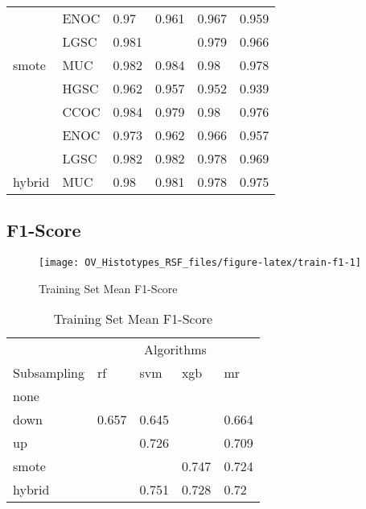 \documentclass[
]{report}
\begin{document}
\begin{table}
\begin{tabular}[t]{l|l|l|l|l|l}
\cline{2-6}
 & ENOC & 0.97 & 0.961 & 0.967 & 0.959\\
\cline{2-6}
 & LGSC & 0.981 & \cellcolor[HTML]{90ee90}{0.985} & 0.979 & 0.966\\
\cline{2-6}
\multirow{-5}{*}{\raggedright\arraybackslash smote} & MUC & 0.982 & 0.984 & 0.98 & 0.978\\
\cline{1-6}
 & HGSC & 0.962 & 0.957 & 0.952 & 0.939\\
\cline{2-6}
 & CCOC & 0.984 & 0.979 & 0.98 & 0.976\\
\cline{2-6}
 & ENOC & 0.973 & 0.962 & 0.966 & 0.957\\
\cline{2-6}
 & LGSC & 0.982 & 0.982 & 0.978 & 0.969\\
\cline{2-6}
\multirow{-5}{*}{\raggedright\arraybackslash hybrid} & MUC & 0.98 & 0.981 & 0.978 & 0.975\\
\hline
\end{tabular}
\end{table}

\hypertarget{f1-score-1}{%
\subsection{F1-Score}\label{f1-score-1}}

\begin{figure}[H]

{\centering \texttt{[image: OV\_Histotypes\_RSF\_files/figure-latex/train-f1-1]} 

}

\caption{Training Set Mean F1-Score}\label{fig:train-f1}
\end{figure}

\begin{table}

\caption{\label{tab:train-f1-table}Training Set Mean F1-Score}
\centering
\begin{tabular}[t]{l|l|l|l|l}
\hline
\multicolumn{1}{c|}{ } & \multicolumn{4}{c}{Algorithms} \\
\cline{2-5}
Subsampling & rf & svm & xgb & mr\\
\hline
none & \cellcolor[HTML]{FF0000}{0.787} & \cellcolor[HTML]{FFD700}{0.801} & \cellcolor[HTML]{FF0000}{0.897} & \cellcolor[HTML]{FF0000}{0.822}\\
\hline
down & 0.657 & 0.645 & \cellcolor[HTML]{FF0000}{0.231} & 0.664\\
\hline
up & \cellcolor[HTML]{FFD700}{0.755} & 0.726 & \cellcolor[HTML]{FFD700}{0.776} & 0.709\\
\hline
smote & \cellcolor[HTML]{FFD700}{0.748} & \cellcolor[HTML]{FFD700}{0.75} & 0.747 & 0.724\\
\hline
hybrid & \cellcolor[HTML]{90ee90}{0.77} & 0.751 & 0.728 & 0.72\\
\hline
\end{tabular}
\end{table}
\end{document}
